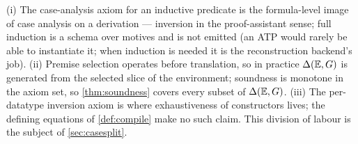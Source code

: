 \begin{remark}
\label{rem:theory-notes}
(i) The case-analysis axiom for an inductive predicate is the
formula-level image of case analysis on a derivation --- inversion in the
proof-assistant sense; full induction is a schema over motives and is not
emitted (an ATP would rarely be able to instantiate it; when induction is
needed it is the reconstruction backend's job).  (ii) Premise selection
operates before translation, so in practice $\Delta(\mathbb{E},G)$ is generated from the
selected slice of the environment; soundness is monotone in the axiom set,
so \cref{thm:soundness} covers every subset of $\Delta(\mathbb{E},G)$.  (iii) The
per-datatype inversion axiom is where exhaustiveness of constructors
lives; the defining equations of \cref{def:compile} make no such claim.
This division of labour is the subject of \cref{sec:casesplit}.
\end{remark}
